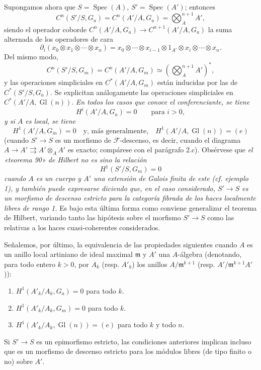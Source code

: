 Supongamos ahora que $S=\operatorname{Spec}(A)$,
$S'=\operatorname{Spec}(A')$; entonces
\[
  C^n(S'/S,G_a)=C^n(A'/A,G_a)=\bigotimes_A^{n+1}A',
\]
siendo el operador coborde
$C^n(A'/A,G_a)\longrightarrow C^{n+1}(A'/A,G_a)$ la suma alternada de los
operadores de cara
\[
  \partial_i(x_0\otimes x_1\otimes\cdots\otimes x_n)
  =x_0\otimes\cdots\otimes x_{i-1}\otimes1_{A'}\otimes
   x_i\otimes\cdots\otimes x_n.
\]
Del mismo modo,
\[
  C^n(S'/S,G_m)=C^n(A'/A,G_m)
  \simeq\left(\bigotimes_A^{n+1}A'\right)^*,
\]
y las operaciones simpliciales en $C^*(A'/A,G_m)$ están inducidas por las de
$C^*(S'/S,G_a)$. Se explicitan análogamente las operaciones simpliciales en
$C^*(A'/A,\operatorname{Gl}(n))$. \emph{En todos los casos que conoce el
conferenciante, se tiene}
\[
  H^i(A'/A,G_a)=0\qquad\text{para $i>0$},
\]
\emph{y si $A$ es local, se tiene}
\[
  H^1(A'/A,G_m)=0
  \quad\text{y, más generalmente,}\quad
  H^1(A'/A,\operatorname{Gl}(n))=(e)
\]
(cuando $S'\longrightarrow S$ es un morfismo de $\mathcal F$-descenso, es
decir, cuando el diagrama
$A\longrightarrow A'\rightrightarrows A'\otimes_AA'$ es exacto; compárese con
el parágrafo 2.c). Obsérvese que \emph{el «teorema 90» de Hilbert no es sino
la relación}
\[
  H^1(S'/S,G_m)=0
\]
\emph{cuando $A$ es un cuerpo y $A'$ una extensión de Galois finita de este
(cf. ejemplo 1), y también puede expresarse diciendo que, en el caso
considerado, $S'\longrightarrow S$ es un morfismo de descenso estricto para la
categoría fibrada de los haces localmente libres de rango 1.} Es bajo esta
última forma como conviene generalizar el teorema de Hilbert, variando tanto
las hipótesis sobre el morfismo $S'\longrightarrow S$ como las relativas a los
haces cuasi-coherentes considerados.

Señalemos, por último, la equivalencia de las propiedades siguientes cuando
$A$ es un anillo local artiniano de ideal maximal $\mathfrak m$ y $A'$ una
$A$-álgebra (denotando, para todo entero $k>0$, por $A_k$ (resp. $A'_k$) los
anillos $A/\mathfrak m^{k+1}$ (resp. $A'/\mathfrak m^{k+1}A'$)):
\begin{enumerate}
\item[(i)] $H^1(A'_k/A_k,G_a)=0$ para todo $k$.
\item[(ii)] $H^1(A'_k/A_k,G_m)=0$ para todo $k$.
\item[(iii)] $H^1(A'_k/A_k,\operatorname{Gl}(n))=(e)$ para todo $k$ y todo
$n$.
\end{enumerate}
Si $S'\longrightarrow S$ es un epimorfismo estricto, las condiciones
anteriores implican incluso que es un morfismo de descenso estricto para los
módulos libres (de tipo finito o no) sobre $A'$.

